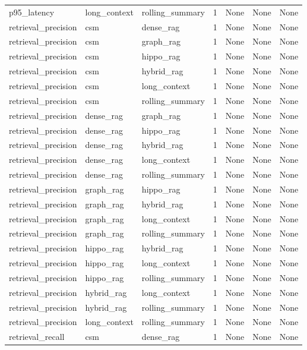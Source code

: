 \begin{tabular}{lllllll}
p95\_latency & long\_context & rolling\_summary & 1 & None & None & None \\
retrieval\_precision & csm & dense\_rag & 1 & None & None & None \\
retrieval\_precision & csm & graph\_rag & 1 & None & None & None \\
retrieval\_precision & csm & hippo\_rag & 1 & None & None & None \\
retrieval\_precision & csm & hybrid\_rag & 1 & None & None & None \\
retrieval\_precision & csm & long\_context & 1 & None & None & None \\
retrieval\_precision & csm & rolling\_summary & 1 & None & None & None \\
retrieval\_precision & dense\_rag & graph\_rag & 1 & None & None & None \\
retrieval\_precision & dense\_rag & hippo\_rag & 1 & None & None & None \\
retrieval\_precision & dense\_rag & hybrid\_rag & 1 & None & None & None \\
retrieval\_precision & dense\_rag & long\_context & 1 & None & None & None \\
retrieval\_precision & dense\_rag & rolling\_summary & 1 & None & None & None \\
retrieval\_precision & graph\_rag & hippo\_rag & 1 & None & None & None \\
retrieval\_precision & graph\_rag & hybrid\_rag & 1 & None & None & None \\
retrieval\_precision & graph\_rag & long\_context & 1 & None & None & None \\
retrieval\_precision & graph\_rag & rolling\_summary & 1 & None & None & None \\
retrieval\_precision & hippo\_rag & hybrid\_rag & 1 & None & None & None \\
retrieval\_precision & hippo\_rag & long\_context & 1 & None & None & None \\
retrieval\_precision & hippo\_rag & rolling\_summary & 1 & None & None & None \\
retrieval\_precision & hybrid\_rag & long\_context & 1 & None & None & None \\
retrieval\_precision & hybrid\_rag & rolling\_summary & 1 & None & None & None \\
retrieval\_precision & long\_context & rolling\_summary & 1 & None & None & None \\
retrieval\_recall & csm & dense\_rag & 1 & None & None & None \\

\end{tabular}
